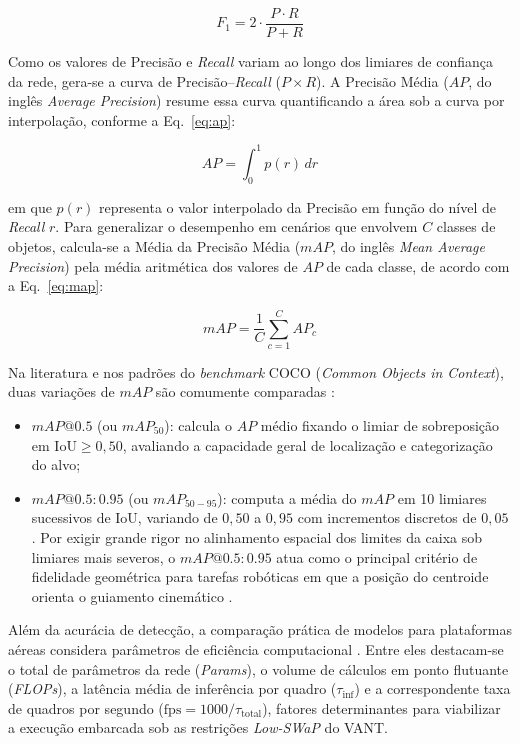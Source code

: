 \begin{equation}
F_1 = 2 \cdot \frac{P \cdot R}{P + R}
\label{eq:f1_score}
\end{equation}

Como os valores de Precisão e \textit{Recall} variam ao longo dos limiares de confiança da rede, gera-se a curva de Precisão--\textit{Recall} ($P \times R$). A Precisão Média ($AP$, do inglês \textit{Average Precision}) resume essa curva quantificando a área sob a curva por interpolação, conforme a Eq.~\ref{eq:ap}:

\begin{equation}
AP = \int_{0}^{1} p(r) \, dr
\label{eq:ap}
\end{equation}

\noindent em que $p(r)$ representa o valor interpolado da Precisão em função do nível de \textit{Recall} $r$. Para generalizar o desempenho em cenários que envolvem $C$ classes de objetos, calcula-se a Média da Precisão Média ($mAP$, do inglês \textit{Mean Average Precision}) pela média aritmética dos valores de $AP$ de cada classe, de acordo com a Eq.~\ref{eq:map}:

\begin{equation}
mAP = \frac{1}{C} \sum_{c=1}^{C} AP_c
\label{eq:map}
\end{equation}

\noindent Na literatura e nos padrões do \textit{benchmark} COCO (\textit{Common Objects in Context}), duas variações de $mAP$ são comumente comparadas \cite{padilla2021, ultralytics_metrics}:
\begin{itemize}
    \item $mAP@0.5$ (ou $mAP_{50}$): calcula o $AP$ médio fixando o limiar de sobreposição em $\text{IoU} \ge 0{,}50$, avaliando a capacidade geral de localização e categorização do alvo;
    \item $mAP@0.5:0.95$ (ou $mAP_{50-95}$): computa a média do $mAP$ em 10 limiares sucessivos de IoU, variando de $0{,}50$ a $0{,}95$ com incrementos discretos de $0{,}05$. Por exigir grande rigor no alinhamento espacial dos limites da caixa sob limiares mais severos, o $mAP@0.5:0.95$ atua como o principal critério de fidelidade geométrica para tarefas robóticas em que a posição do centroide orienta o guiamento cinemático \cite{ultralytics_metrics}.
\end{itemize}

Além da acurácia de detecção, a comparação prática de modelos para plataformas aéreas considera parâmetros de eficiência computacional \cite{ultralytics_metrics}. Entre eles destacam-se o total de parâmetros da rede (\textit{Params}), o volume de cálculos em ponto flutuante (\textit{FLOPs}), a latência média de inferência por quadro ($\tau_{\text{inf}}$) e a correspondente taxa de quadros por segundo ($\text{fps} = 1000 / \tau_{\text{total}}$), fatores determinantes para viabilizar a execução embarcada sob as restrições \textit{Low-SWaP} do VANT.

